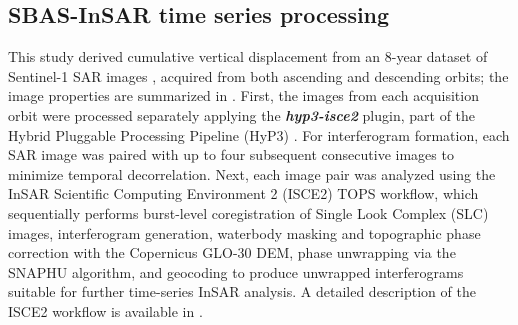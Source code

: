 
\subsection{SBAS-InSAR time series processing}
\label{subsec:sbas}

This study derived cumulative vertical displacement from an 8-year dataset of Sentinel-1 SAR images , acquired from both ascending and descending orbits; the image properties are summarized in . First, the images from each acquisition orbit were processed separately applying the \textbf{\textit{hyp3-isce2}} plugin, part of the Hybrid Pluggable Processing Pipeline (HyP3) \citep{hyp3-isce2}. For interferogram formation, each SAR image was paired with up to four subsequent consecutive images to minimize temporal decorrelation. Next, each image pair was analyzed using the InSAR Scientific Computing Environment 2 (ISCE2) TOPS workflow, which sequentially performs burst-level coregistration of Single Look Complex (SLC) images, interferogram generation, waterbody masking and topographic phase correction with the Copernicus GLO-30 DEM, phase unwrapping via the SNAPHU algorithm, and geocoding to produce unwrapped interferograms suitable for further time-series InSAR analysis. A detailed description of the ISCE2 workflow is available in \citep{isce2_rosen, tops, nesd_tops}.

